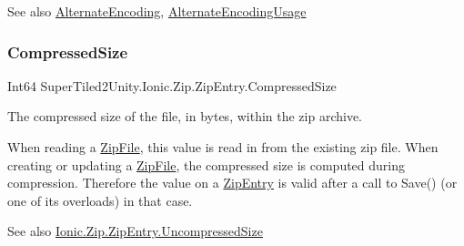 \begin{DoxySeeAlso}{See also}
\mbox{\hyperlink{class_super_tiled2_unity_1_1_ionic_1_1_zip_1_1_zip_entry_a7a5ff9afc8cad1de6fbfc76a7bf786ee}{Alternate\+Encoding}}, \mbox{\hyperlink{class_super_tiled2_unity_1_1_ionic_1_1_zip_1_1_zip_entry_a972512ebe8d25c895ad0d67e75e24bfb}{Alternate\+Encoding\+Usage}}


\end{DoxySeeAlso}
\mbox{\label{class_super_tiled2_unity_1_1_ionic_1_1_zip_1_1_zip_entry_a45604152b5da4f8c24ee1e89abb1c396}} 
\subsubsection{\texorpdfstring{Compressed\+Size}{CompressedSize}}
{\footnotesize\ttfamily Int64 Super\+Tiled2\+Unity.\+Ionic.\+Zip.\+Zip\+Entry.\+Compressed\+Size\hspace{0.3cm}{\ttfamily [get]}}



The compressed size of the file, in bytes, within the zip archive. 

When reading a {\ttfamily \mbox{\hyperlink{class_super_tiled2_unity_1_1_ionic_1_1_zip_1_1_zip_file}{Zip\+File}}}, this value is read in from the existing zip file. When creating or updating a {\ttfamily \mbox{\hyperlink{class_super_tiled2_unity_1_1_ionic_1_1_zip_1_1_zip_file}{Zip\+File}}}, the compressed size is computed during compression. Therefore the value on a {\ttfamily \mbox{\hyperlink{class_super_tiled2_unity_1_1_ionic_1_1_zip_1_1_zip_entry}{Zip\+Entry}}} is valid after a call to {\ttfamily Save()} (or one of its overloads) in that case. 

\begin{DoxySeeAlso}{See also}
\mbox{\hyperlink{class_super_tiled2_unity_1_1_ionic_1_1_zip_1_1_zip_entry_ad41c71d426caa6377c1af3682bd2055c}{Ionic.\+Zip.\+Zip\+Entry.\+Uncompressed\+Size}}


\end{DoxySeeAlso}
\mbox{\label{class_super_tiled2_unity_1_1_ionic_1_1_zip_1_1_zip_entry_a33bd0a9dc3440f2ee25bdf798c17d33d}} 
